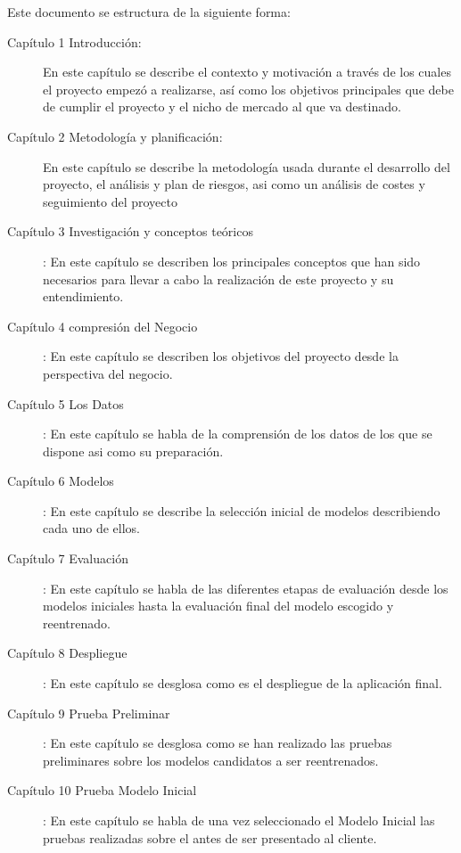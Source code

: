 Este documento se estructura de la siguiente forma:
\begin{description}
\item[Capítulo 1 Introducción:] En este capítulo se describe el contexto y motivación a través de los cuales el proyecto empezó a realizarse,  así como los objetivos principales que debe de cumplir el proyecto y el nicho de mercado al que va destinado.

\item[Capítulo 2 Metodología y planificación:] En este capítulo se describe la metodología usada durante el desarrollo del proyecto, el análisis y plan de riesgos, asi como un análisis de costes y seguimiento del proyecto

\item[Capítulo 3 Investigación y conceptos teóricos]: En este capítulo se describen los principales conceptos que han sido necesarios para llevar a cabo la realización de este proyecto y su entendimiento.

\item[Capítulo 4 compresión del Negocio]: En este capítulo se describen los objetivos del proyecto desde la perspectiva del negocio.

\item[Capítulo 5 Los Datos]: En este capítulo se habla de la comprensión de los datos de los que se dispone asi como su preparación.

\item[Capítulo 6 Modelos]: En este capítulo se describe la selección inicial de modelos describiendo cada uno de ellos.

\item[Capítulo 7 Evaluación]: En este capítulo se habla de las diferentes etapas de evaluación desde los modelos iniciales hasta la evaluación final del modelo escogido y reentrenado.

\item[Capítulo 8 Despliegue]: En este capítulo se desglosa como es el despliegue de la aplicación final.

\item[Capítulo 9 Prueba Preliminar]: En este capítulo se desglosa como se han realizado las pruebas preliminares sobre los modelos candidatos a ser reentrenados.

\item[Capítulo 10 Prueba Modelo Inicial]: En este capítulo se habla de una vez seleccionado el Modelo Inicial las pruebas realizadas sobre el antes de ser presentado al cliente.


\end{description}
